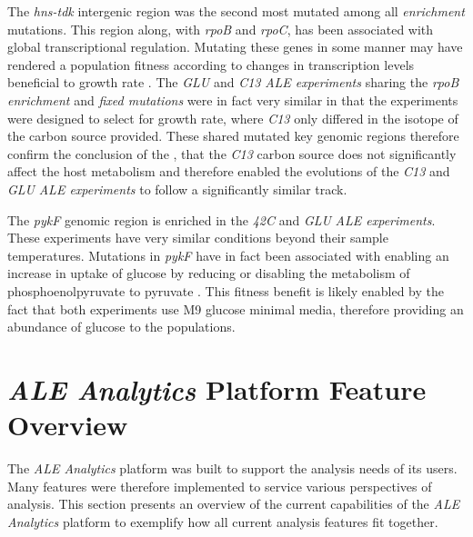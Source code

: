 \documentclass[12pt,final,masters,chapterheads]{ucsd}  %
\begin{document}
The \textit{hns-tdk} intergenic region was the second most mutated among all \textit{enrichment} mutations. This region along, with \textit{rpoB} and \textit{rpoC}, has been associated with global transcriptional regulation. Mutating these genes in some manner may have rendered a population fitness according to changes in transcription levels beneficial to growth rate \cite{Kobayashi01011990, AYERS1989749, Cheng2014, Wang1445}. The \textit{GLU} and \textit{C13} \textit{ALE experiments} sharing the \textit{rpoB} \textit{enrichment} and \textit{fixed mutations} were in fact very similar in that the experiments were designed to select for growth rate, where \textit{C13} only differed in the isotope of the carbon source provided. These shared mutated key genomic regions therefore confirm the conclusion of the \cite{pmid26964043}, that the \textit{C13} carbon source does not significantly affect the host metabolism and therefore enabled the evolutions of the \textit{C13} and \textit{GLU} \textit{ALE experiments} to follow a significantly similar track.

The \textit{pykF} genomic region is enriched in the \textit{42C} and \textit{GLU} \textit{ALE experiments}. These experiments have very similar conditions beyond their sample temperatures. Mutations in \textit{pykF} have in fact been associated with enabling an increase in uptake of glucose by reducing or disabling the metabolism of phosphoenolpyruvate to pyruvate \cite{Woods13062006, 10.1371/journal.pgen.1001164, Blank25022014}. This fitness benefit is likely enabled by the fact that both experiments use M9 glucose minimal media, therefore providing an abundance of glucose to the populations.
\section{\textit{ALE Analytics} Platform Feature Overview}
The \textit{ALE Analytics} platform was built to support the analysis needs of its users. Many features were therefore implemented to service various perspectives of analysis. This section presents an overview of the current capabilities of the \textit{ALE Analytics} platform to exemplify how all current analysis features fit together.
\end{document}
